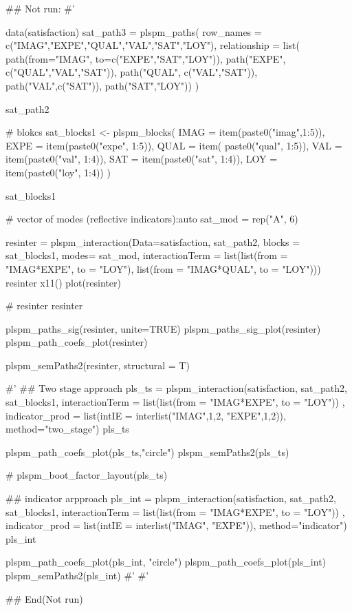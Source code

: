 \documentclass[a4paper]{book}
\begin{document}
\begin{Examples}
\begin{ExampleCode}


## Not run: 
#'

data(satisfaction)
sat_path3 = plspm_paths(
  row_names = c("IMAG","EXPE","QUAL","VAL","SAT","LOY"),
  relationship = list(
    path(from="IMAG", to=c("EXPE","SAT","LOY")),
    path("EXPE", c("QUAL","VAL","SAT")),
    path("QUAL", c("VAL","SAT")),
    path("VAL",c("SAT")),
    path("SAT","LOY"))
)

sat_path2

# blokcs
sat_blocks1 <- plspm_blocks(
  IMAG = item(paste0("imag",1:5)),
  EXPE = item(paste0("expe", 1:5)),
  QUAL = item( paste0("qual", 1:5)),
  VAL = item(paste0("val", 1:4)),
  SAT = item(paste0("sat", 1:4)),
  LOY = item(paste0("loy", 1:4))
)

sat_blocks1

# vector of modes (reflective indicators):auto
sat_mod = rep("A", 6)

resinter = plspm_interaction(Data=satisfaction,
                     sat_path2, blocks = sat_blocks1, modes= sat_mod,
                     interactionTerm = list(list(from = "IMAG*EXPE", to = "LOY"),
                     list(from = "IMAG*QUAL", to = "LOY")))
resinter%
x11()
plot(resinter)

# resinter %
resinter %

plspm_paths_sig(resinter, unite=TRUE)
plspm_paths_sig_plot(resinter)
plspm_path_coefs_plot(resinter)

plspm_semPaths2(resinter, structural = T)


#'
## Two stage approach
pls_ts = plspm_interaction(satisfaction, sat_path2, sat_blocks1,
               interactionTerm = list(list(from = "IMAG*EXPE", to = "LOY")) ,
               indicator_prod = list(intIE = interlist("IMAG",1,2, "EXPE",1,2)),
               method="two_stage")
pls_ts %


plspm_path_coefs_plot(pls_ts,"circle")
plspm_semPaths2(pls_ts)

# plspm_boot_factor_layout(pls_ts)

## indicator arpproach
pls_int = plspm_interaction(satisfaction, sat_path2, sat_blocks1,
                  interactionTerm = list(list(from = "IMAG*EXPE", to = "LOY")) ,
                indicator_prod = list(intIE = interlist("IMAG", "EXPE")),
                  method="indicator")
pls_int %


plspm_path_coefs_plot(pls_int, "circle")
plspm_path_coefs_plot(pls_int)
plspm_semPaths2(pls_int)
#'
#'



## End(Not run)


\end{ExampleCode}
\end{Examples}
\end{document}
